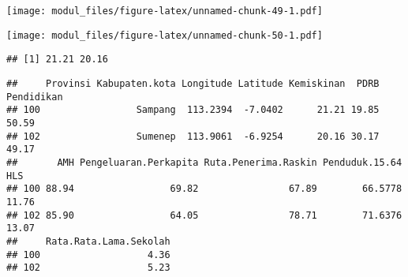 \documentclass[
]{book}
\newenvironment{Shaded}{\begin{snugshade}}{\end{snugshade}}
\newcommand{\DataTypeTok}[1]{\textcolor[rgb]{0.13,0.29,0.53}{#1}}
\newcommand{\DecValTok}[1]{\textcolor[rgb]{0.00,0.00,0.81}{#1}}
\newcommand{\KeywordTok}[1]{\textcolor[rgb]{0.13,0.29,0.53}{\textbf{#1}}}
\newcommand{\NormalTok}[1]{#1}
\newcommand{\OperatorTok}[1]{\textcolor[rgb]{0.81,0.36,0.00}{\textbf{#1}}}
\begin{document}
\begin{Shaded}
\end{Shaded}

\texttt{[image: modul\_files/figure-latex/unnamed-chunk-49-1.pdf]}

\begin{Shaded}
\end{Shaded}

\texttt{[image: modul\_files/figure-latex/unnamed-chunk-50-1.pdf]}

\begin{Shaded}
\end{Shaded}

\begin{verbatim}
## [1] 21.21 20.16
\end{verbatim}

\begin{Shaded}
\end{Shaded}

\begin{verbatim}
##     Provinsi Kabupaten.kota Longitude Latitude Kemiskinan  PDRB Pendidikan
## 100                 Sampang  113.2394  -7.0402      21.21 19.85      50.59
## 102                 Sumenep  113.9061  -6.9254      20.16 30.17      49.17
##       AMH Pengeluaran.Perkapita Ruta.Penerima.Raskin Penduduk.15.64   HLS
## 100 88.94                 69.82                67.89        66.5778 11.76
## 102 85.90                 64.05                78.71        71.6376 13.07
##     Rata.Rata.Lama.Sekolah
## 100                   4.36
## 102                   5.23
\end{verbatim}
\end{document}

